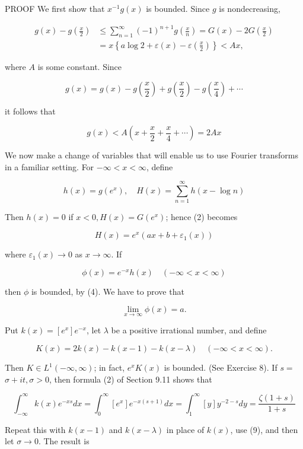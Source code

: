 \documentclass[10pt]{article}
\begin{document}
PROOF We first show that $x^{-1} g(x)$ is bounded. Since $g$ is nondecreasing,

$$
\begin{aligned}
g(x)-g\left(\frac{x}{2}\right) & \leq \sum_{n=1}^{\infty}(-1)^{n+1} g\left(\frac{x}{n}\right)=G(x)-2 G\left(\frac{x}{2}\right) \\
& =x\left\{a \log 2+\varepsilon(x)-\varepsilon\left(\frac{x}{2}\right)\right\}<A x,
\end{aligned}
$$

where $A$ is some constant. Since

$$
g(x)=g(x)-g\left(\frac{x}{2}\right)+g\left(\frac{x}{2}\right)-g\left(\frac{x}{4}\right)+\cdots
$$

it follows that

$$
g(x)<A\left(x+\frac{x}{2}+\frac{x}{4}+\cdots\right)=2 A x
$$

We now make a change of variables that will enable us to use Fourier transforms in a familiar setting. For $-\infty<x<\infty$, define

$$
h(x)=g\left(e^{x}\right), \quad H(x)=\sum_{n=1}^{\infty} h(x-\log n)
$$

Then $h(x)=0$ if $x<0, H(x)=G\left(e^{x}\right)$; hence (2) becomes

$$
H(x)=e^{x}\left(a x+b+\varepsilon_{1}(x)\right)
$$

where $\varepsilon_{1}(x) \rightarrow 0$ as $x \rightarrow \infty$. If

$$
\phi(x)=e^{-x} h(x) \quad(-\infty<x<\infty)
$$

then $\phi$ is bounded, by (4). We have to prove that

$$
\lim _{x \rightarrow \infty} \phi(x)=a .
$$

Put $k(x)=\left[e^{x}\right] e^{-x}$, let $\lambda$ be a positive irrational number, and define

$$
K(x)=2 k(x)-k(x-1)-k(x-\lambda) \quad(-\infty<x<\infty) .
$$

Then $K \in L^{1}(-\infty, \infty)$; in fact, $e^{x} K(x)$ is bounded. (See Exercise 8). If $s=$ $\sigma+i t, \sigma>0$, then formula (2) of Section 9.11 shows that

$$
\int_{-\infty}^{\infty} k(x) e^{-x s} d x=\int_{0}^{\infty}\left[e^{x}\right] e^{-x(s+1)} d x=\int_{1}^{\infty}[y] y^{-2-s} d y=\frac{\zeta(1+s)}{1+s}
$$

Repeat this with $k(x-1)$ and $k(x-\lambda)$ in place of $k(x)$, use (9), and then let $\sigma \rightarrow 0$. The result is
\end{document}
